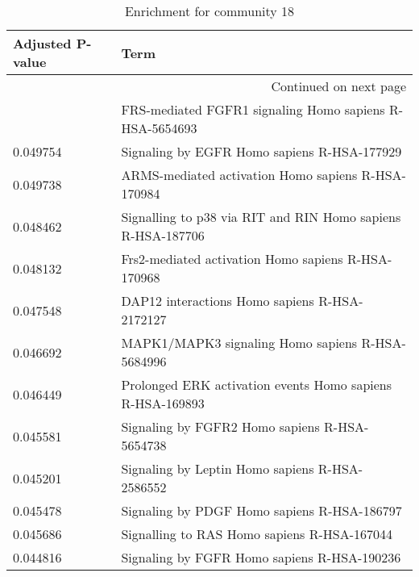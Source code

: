 \begin{longtable}{p{2.4cm}p{14.5cm}}
\caption{Enrichment for community 18}\\
\toprule
Adjusted \newline P-value &                                                                                     Term \\
\midrule
\endhead
\midrule
\multicolumn{2}{r}{{Continued on next page}} \\
\midrule
\endfoot

\bottomrule
\endlastfoot
                 0.049641 &                                  FRS-mediated FGFR1 signaling Homo sapiens R-HSA-5654693 \\
                 0.049754 &                                              Signaling by EGFR Homo sapiens R-HSA-177929 \\
                 0.049738 &                                       ARMS-mediated activation Homo sapiens R-HSA-170984 \\
                 0.048462 &                              Signalling to p38 via RIT and RIN Homo sapiens R-HSA-187706 \\
                 0.048132 &                                       Frs2-mediated activation Homo sapiens R-HSA-170968 \\
                 0.047548 &                                            DAP12 interactions Homo sapiens R-HSA-2172127 \\
                 0.046692 &                                         MAPK1/MAPK3 signaling Homo sapiens R-HSA-5684996 \\
                 0.046449 &                                Prolonged ERK activation events Homo sapiens R-HSA-169893 \\
                 0.045581 &                                            Signaling by FGFR2 Homo sapiens R-HSA-5654738 \\
                 0.045201 &                                           Signaling by Leptin Homo sapiens R-HSA-2586552 \\
                 0.045478 &                                              Signaling by PDGF Homo sapiens R-HSA-186797 \\
                 0.045686 &                                              Signalling to RAS Homo sapiens R-HSA-167044 \\
                 0.044816 &                                              Signaling by FGFR Homo sapiens R-HSA-190236 \\

\end{longtable}
